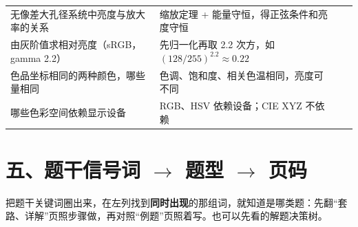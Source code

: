 {\begin{longtable}{@{}P{6.6cm}P{8.5cm}>{\raggedleft\arraybackslash}p{0.8cm}>{\raggedleft\arraybackslash}p{0.8cm}@{}}
无像差大孔径系统中亮度与放大率的关系 & 缩放定理 + 能量守恒，得正弦条件和亮度守恒 & \pageref{sec:luminance} & \pageref{sec:exgC}\\
由灰阶值求相对亮度（sRGB，gamma 2.2） & 先归一化再取 2.2 次方，如 $(128/255)^{2.2}\approx0.22$ & \pageref{sec:gammacalc} & \pageref{sec:exgC}\\
色品坐标相同的两种颜色，哪些量相同 & 色调、饱和度、相关色温相同，亮度可不同 & \pageref{sec:color} & \pageref{sec:exgC}\\
哪些色彩空间依赖显示设备 & RGB、HSV 依赖设备；CIE XYZ 不依赖 & \pageref{sec:color} & \pageref{sec:exgC}\\
\end{longtable}}

\section*{五、题干信号词 $\to$ 题型 $\to$ 页码}\label{tab:signal}
\noindent 把题干关键词圈出来，在左列找到\textbf{同时出现}的那组词，就知道是哪类题：先翻“套路、详解”页照步骤做，再对照“例题”页照着写。也可以先看\pageref{fig:dectree}的解题决策树。

